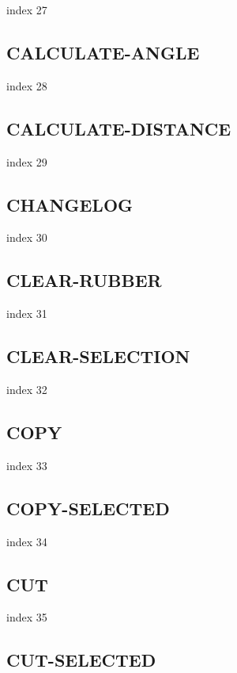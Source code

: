\documentclass[a4paper]{report}
\begin{document}
index 27

\subsection{CALCULATE-ANGLE}

index 28

\subsection{CALCULATE-DISTANCE}

index 29

\subsection{CHANGELOG}

index 30

\subsection{CLEAR-RUBBER}

index 31

\subsection{CLEAR-SELECTION}

index 32

\subsection{COPY}

index 33

\subsection{COPY-SELECTED}

index 34

\subsection{CUT}

index 35

\subsection{CUT-SELECTED}
\end{document}
